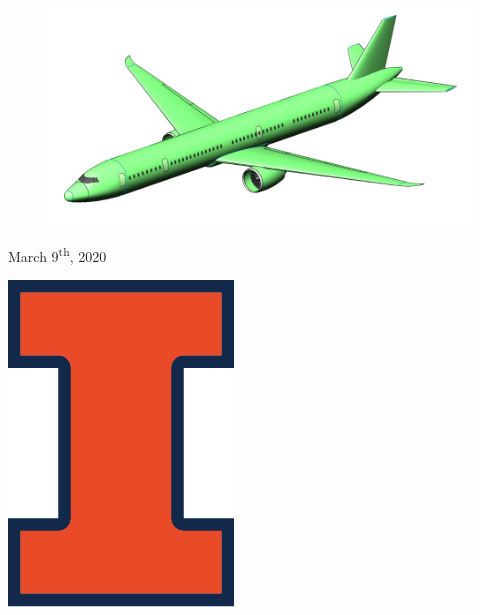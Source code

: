 \begin{titlepage}
	
        \begin{figure}[H]
            \centering
            \includegraphics[width=0.9\linewidth]{Photos/Detailed Isometric PDR.jpeg}
            \label{figISO}
        \end{figure}
	
	\vfill\vfill\vfill %
	
	{\large March 9\textsuperscript{th}, 2020} %
	
	
	\vfill\vfill
	\begin{minipage}{\linewidth}
		\begin{flushright}
	        \includegraphics[scale=0.5]{Photos/Illinois-Logo-Full-Color-RGB.png}\\[1cm]
		\end{flushright}
	\end{minipage}
	 
	
	\vfill %
	
\end{titlepage}




